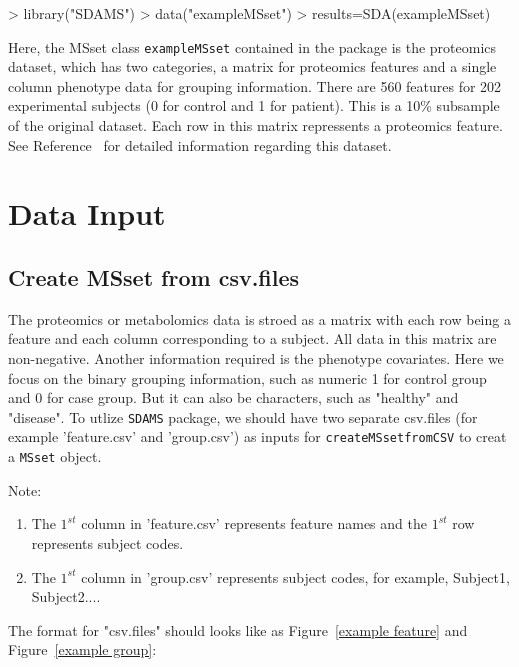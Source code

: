 \documentclass[12pt]{article}
\begin{document}
\begin{Schunk}
\begin{Sinput}
> library("SDAMS")
> data("exampleMSset")
> results=SDA(exampleMSset)
\end{Sinput}
\end{Schunk}

Here, the MSset class {\tt exampleMSset} contained in the package is the
proteomics dataset, which has two categories, a matrix for proteomics features
and a single column phenotype data for grouping information. There are 560
features for 202 experimental subjects (0 for control and 1 for patient). This
is a 10\% subsample of the original dataset. Each row in this matrix repressents
a proteomics feature. See Reference~ \cite{siwy2011human} for detailed
information regarding this dataset.



\section{Data Input}


\subsection{Create MSset from csv.files}
The proteomics or metabolomics data is stroed as a matrix with each
row being a feature and each column corresponding to a subject. All data in this
matrix are non-negative. Another information required is the phenotype
covariates. Here we focus on the binary grouping information, such as numeric 1
for control group and 0 for case group. But it can also be characters, such as
"healthy" and "disease". To utlize {\tt SDAMS} package, we should have two
separate csv.files (for example 'feature.csv' and 'group.csv') as inputs for
{\tt createMSsetfromCSV} to creat a {\tt MSset} object.

Note:
\begin{enumerate}
\item The $1^{st}$ column in 'feature.csv' represents feature names and the
      $1^{st}$ row represents subject codes.
\item The $1^{st}$ column in 'group.csv' represents subject codes, for example,
      Subject1, Subject2....
\end{enumerate}


The format for "csv.files" should looks like as Figure~\ref{example feature}
and Figure~\ref{example group}:
\end{document}
